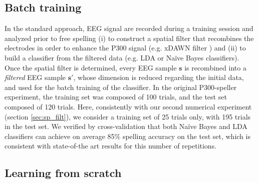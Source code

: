 \documentclass[conference]{IEEEtran}
\begin{document}
\subsection{Batch training}\label{sec:batch}


In the standard approach, EEG signal are recorded during a training session and analyzed prior to free spelling 
(i) to construct a spatial filter that recombines the electrodes
in order to enhance the P300 signal (e.g. xDAWN filter \cite{Rivet09}) and 
(ii) to build a classifier from the filtered data (e.g. LDA \cite{Krusienski08} or Na\"ive Bayes \cite{Ang12,Maby10} classifiers).
Once the spatial filter is determined,
every EEG sample $\mathbf{s}$ is recombined into a \emph{filtered} EEG sample $\mathbf{s}'$,
whose dimension is reduced regarding the initial data,
and used for the batch training of the classifier. 
In the original P300-speller experiment, the training set was composed of
100 trials, and the test set composed of 120 trials.
Here, consistently with our second numerical experiment (section \ref{sec:sp_filt}), we consider a training set of 25 trials only, with 195 trials in the test set.
We verified by cross-validation that both Na\"ive Bayes and LDA classifiers can achieve on average
85\% spelling accuracy  on the test set, which is consistent with state-of-the art results for this number of repetitions.

\subsection{Learning from scratch}
\end{document}
